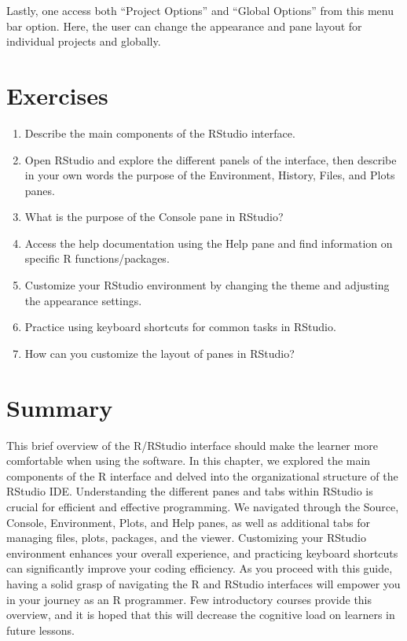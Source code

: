 \documentclass[
  letterpaper,
  DIV=11,
  numbers=noendperiod]{scrreprt}
\providecommand{\tightlist}{%
  \setlength{\itemsep}{0pt}\setlength{\parskip}{0pt}}\usepackage{longtable,booktabs,array}
\begin{document}
Lastly, one access both ``Project Options'' and ``Global Options'' from
this menu bar option. Here, the user can change the appearance and pane
layout for individual projects and globally.

\section{Exercises}\label{exercises-2}

\begin{enumerate}
\def\labelenumi{\roman{enumi}.}
\tightlist
\item
  Describe the main components of the RStudio interface.
\item
  Open RStudio and explore the different panels of the interface, then
  describe in your own words the purpose of the Environment, History,
  Files, and Plots panes.
\item
  What is the purpose of the Console pane in RStudio?
\item
  Access the help documentation using the Help pane and find information
  on specific R functions/packages.
\item
  Customize your RStudio environment by changing the theme and adjusting
  the appearance settings.
\item
  Practice using keyboard shortcuts for common tasks in RStudio.
\item
  How can you customize the layout of panes in RStudio?
\end{enumerate}

\section{Summary}\label{summary-2}

This brief overview of the R/RStudio interface should make the learner
more comfortable when using the software. In this chapter, we explored
the main components of the R interface and delved into the
organizational structure of the RStudio IDE. Understanding the different
panes and tabs within RStudio is crucial for efficient and effective
programming. We navigated through the Source, Console, Environment,
Plots, and Help panes, as well as additional tabs for managing files,
plots, packages, and the viewer. Customizing your RStudio environment
enhances your overall experience, and practicing keyboard shortcuts can
significantly improve your coding efficiency. As you proceed with this
guide, having a solid grasp of navigating the R and RStudio interfaces
will empower you in your journey as an R programmer. Few introductory
courses provide this overview, and it is hoped that this will decrease
the cognitive load on learners in future lessons.
\end{document}

